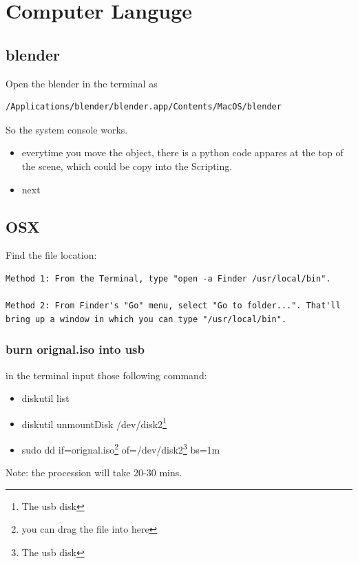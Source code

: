 \chapter{Computer Languge}
\label{ch:Computer Languge}

\section{blender}

Open the blender in the terminal as 
\begin{verbatim}
/Applications/blender/blender.app/Contents/MacOS/blender
\end{verbatim}
So the system console works.

\begin{itemize}
\item everytime you move the object, there is a python code appares at the top of the scene, which could be copy into the Scripting.
\item  next
\end{itemize}


\section{OSX}

Find the file location:
\begin{verbatim}
Method 1: From the Terminal, type "open -a Finder /usr/local/bin".

Method 2: From Finder's "Go" menu, select "Go to folder...". That'll bring up a window in which you can type "/usr/local/bin".
\end{verbatim}

\subsection{burn orignal.iso into usb}

in the terminal input those following command:

\begin{itemize}
\item diskutil list
\item diskutil unmountDisk /dev/disk2\footnote{The usb disk}   
\item sudo dd if=orignal.iso\footnote{you can drag the file into here} of=/dev/disk2\footnote{The usb disk} bs=1m
\end{itemize}

Note:
the procession will take 20-30 mins.

